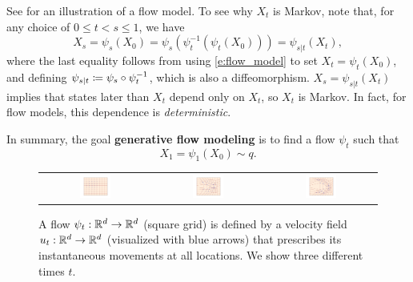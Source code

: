 \documentclass{fairmeta}
\newcommand{\highlight}[1]{{\color{metablue} \textbf{#1}}}
\numberwithin{equation}{section}
\begin{document}
See  for an illustration of a flow model. To see why $X_t$ is Markov, note that, for any choice of $0\leq t < s \leq 1$, we have
\begin{equation}\label{e:flow_is_markov}
    X_s = \psi_s(X_0) = \psi_s(\psi_t^{-1}( \psi_t(X_0) ) ) = \psi_{s|t}(X_t),
\end{equation}
where the last equality follows from using \cref{e:flow_model} to set $X_t = \psi_t(X_0)$, and defining $\psi_{s|t}\coloneqq \psi_s\circ \psi_t^{-1}$, which is also a diffeomorphism.
$X_s=\psi_{s|t}(X_t)$ implies that states later than $X_t$ depend only on $X_t$, so $X_t$ is Markov.
In fact, for flow models, this dependence is \emph{deterministic}.

In summary, the goal \highlight{generative flow modeling} is to find a flow $\psi_t$ such that 
\begin{equation}
    X_1 = \psi_1(X_0) \sim q. %
\end{equation}





\begin{figure}
    \centering
    \begin{tabular}{ccc}
         \includegraphics[width=0.3\textwidth]{assets/flow_velocity/flow_1.png} &
         \includegraphics[width=0.3\textwidth]{assets/flow_velocity/flow_10.png} &
         \includegraphics[width=0.3\textwidth]{assets/flow_velocity/flow_16.png} 
    \end{tabular}
    \caption{A flow $\psi_t:\mathbb R^d\rightarrow \mathbb R^d$ (square grid) is defined by a velocity field $u_t :\mathbb R^d\rightarrow\mathbb R^d$ (visualized with blue arrows) that prescribes its instantaneous movements at all locations. We show three different times $t$.}
    \label{fig:flow}
\end{figure}
\end{document}
